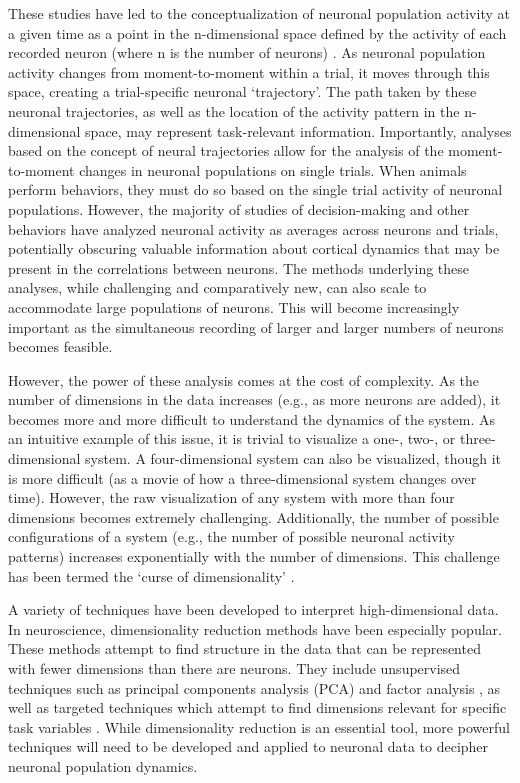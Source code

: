 These studies have led to the conceptualization of neuronal population activity at a given time as a point in the n-dimensional space defined by the activity of each recorded neuron (where n is the number of neurons) \citep{Harvey:2012du, Mazor:2005jp, Briggman:2005jd, Raposo:2014df, Churchland:2012bq}. As neuronal population activity changes from moment-to-moment within a trial, it moves through this space, creating a trial-specific neuronal ‘trajectory’. The path taken by these neuronal trajectories, as well as the location of the activity pattern in the n-dimensional space, may represent task-relevant information. Importantly, analyses based on the concept of neural trajectories allow for the analysis of the moment-to-moment changes in neuronal populations on single trials. When animals perform behaviors, they must do so based on the single trial activity of neuronal populations. However, the majority of studies of decision-making and other behaviors have analyzed neuronal activity as averages across neurons and trials, potentially obscuring valuable information about cortical dynamics that may be present in the correlations between neurons. The methods underlying these analyses, while challenging and comparatively new, can also scale to accommodate large populations of neurons. This will become increasingly important as the simultaneous recording of larger and larger numbers of neurons becomes feasible. 

\bigskip
However, the power of these analysis comes at the cost of complexity. As the number of dimensions in the data increases (e.g., as more neurons are added), it becomes more and more difficult to understand the dynamics of the system. As an intuitive example of this issue, it is trivial to visualize a one-, two-, or three-dimensional system. A four-dimensional system can also be visualized, though it is more difficult (as a movie of how a three-dimensional system changes over time). However, the raw visualization of any system with more than four dimensions becomes extremely challenging. Additionally, the number of possible configurations of a system (e.g., the number of possible neuronal activity patterns) increases exponentially with the number of dimensions. This challenge has been termed the ‘curse of dimensionality’ \citep{Bellman:1961wy}. 

\bigskip
A variety of techniques have been developed to interpret high-dimensional data. In neuroscience, dimensionality reduction methods have been especially popular. These methods attempt to find structure in the data that can be represented with fewer dimensions than there are neurons. They include unsupervised techniques such as principal components analysis (PCA) and factor analysis \citep{Murphy:2012uq, Harvey:2012du, Briggman:2005jd, Mazor:2005jp}, as well as targeted techniques which attempt to find dimensions relevant for specific task variables \citep{Mante:2013ie}. While dimensionality reduction is an essential tool, more powerful techniques will need to be developed and applied to neuronal data to decipher neuronal population dynamics.   

